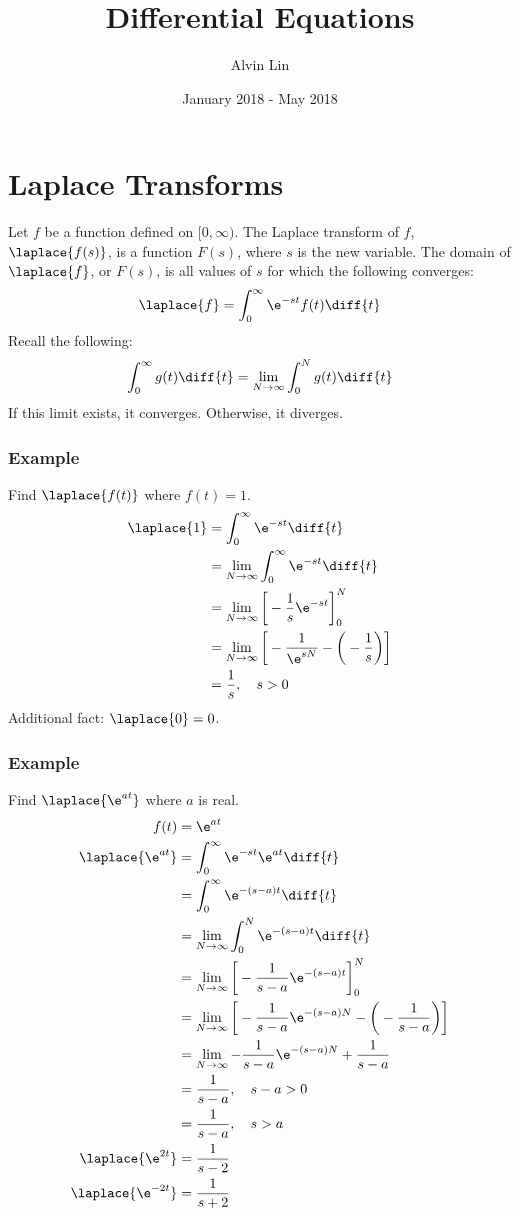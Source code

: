 \documentclass{math}
\title{Differential Equations}
\author{Alvin Lin}
\date{January 2018 - May 2018}
\begin{document}
\maketitle

\section*{Laplace Transforms}
Let \( f \) be a function defined on \( [0,\infty) \). The Laplace transform
of \( f \), \( \laplace{f(s)} \), is a function \( F(s) \), where \( s \)
is the new variable. The domain of \( \laplace{f} \), or \( F(s) \), is all
values of \( s \) for which the following converges:
\[ \laplace{f} = \int_{0}^{\infty}\e^{-st}f(t)\diff{t} \]
Recall the following:
\[ \int_{0}^{\infty}g(t)\diff{t} = \lim_{N\to\infty}\int_{0}^{N}g(t)\diff{t} \]
If this limit exists, it converges. Otherwise, it diverges.

\subsubsection*{Example}
Find \( \laplace{f(t)} \) where \( f(t) = 1 \).
\begin{align*}
  \laplace{1} &= \int_{0}^{\infty}\e^{-st}\diff{t} \\
  &= \lim_{N\to\infty}\int_{0}^{\infty}\e^{-st}\diff{t} \\
  &= \lim_{N\to\infty}\bigg[-\frac{1}{s}\e^{-st}\bigg]_{0}^{N} \\
  &= \lim_{N\to\infty}\bigg[-\frac{1}{\e^{sN}}-\bigg(-\frac{1}{s}\bigg)\bigg] \\
  &= \frac{1}{s}, \quad s > 0
\end{align*}
Additional fact: \( \laplace{0} = 0 \).

\subsubsection*{Example}
Find \( \laplace{\e^{at}} \) where \( a \) is real.
\begin{align*}
  f(t) &= \e^{at} \\
  \laplace{\e^{at}} &= \int_{0}^{\infty}\e^{-st}\e^{at}\diff{t} \\
  &= \int_{0}^{\infty}\e^{-(s-a)t}\diff{t} \\
  &= \lim_{N\to\infty}\int_{0}^{N}\e^{-(s-a)t}\diff{t} \\
  &= \lim_{N\to\infty}\bigg[-\frac{1}{s-a}\e^{-(s-a)t}\bigg]_{0}^{N} \\
  &= \lim_{N\to\infty}\bigg[-\frac{1}{s-a}\e^{-(s-a)N}-
    \bigg(-\frac{1}{s-a}\bigg)\bigg] \\
  &= \lim_{N\to\infty}-\frac{1}{s-a}\e^{-(s-a)N}+\frac{1}{s-a} \\
  &= \frac{1}{s-a}, \quad s-a > 0 \\
  &= \frac{1}{s-a}, \quad s>a \\
  \laplace{\e^{2t}} &= \frac{1}{s-2} \\
  \laplace{\e^{-2t}} &= \frac{1}{s+2}
\end{align*}
\end{document}
